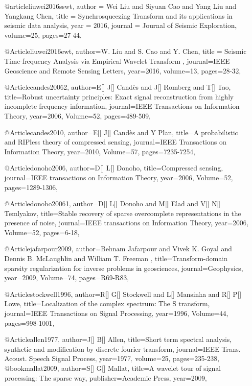 {@article{liuwei2016sswt,
  author =	 {Wei Liu and Siyuan Cao and Yang Liu and Yangkang Chen},
  title =	 {Synchrosqueezing Transform and its applications in seismic data analysis},
  year =	 2016,
  journal =	 {Journal of Seismic Exploration},
  volume={25},
 pages={27-44},
}

@Article{liuwei2016ewt,
  author={W. Liu and S. Cao and Y. Chen},
  title = {Seismic Time-frequency Analysis via Empirical Wavelet Transform
},
  journal={IEEE Geoscience and Remote Sensing Letters},
  year=2016,
  volume=13,
  pages={28-32},
}

@Article{candes20062,
  author={E[] J[] Cand\`{e}s and J[] Romberg and T[] Tao},
  title={Robust uncertainty principles: Exact signal reconstruction from highly incomplete frequency information},
  journal={IEEE Transactions on Information Theory},
  year=2006,
  Volume=52,
  pages={489-509},
}

@Article{candes2010,
  author={E[] J[] Cand\`{e}s and Y Plan},
  title={A probabilistic and RIPless theory of compressed sensing},
  journal={IEEE Transactions on Information Theory},
  year=2010,
  Volume=57,
  pages={7235-7254},
}


@Article{donoho2006,
  author={D[] L[] Donoho},
  title={Compressed sensing},
  journal={IEEE transactions on Information Theory},
  year=2006,
  Volume=52,
  pages={1289-1306},
}

@Article{donoho20061,
  author={D[] L[] Donoho and M[] Elad and V[] N[] Temlyakov},
  title={Stable recovery of sparse overcomplete representations in the presence of noise},
  journal={IEEE transactions on Information Theory},
  year=2006,
  Volume=52,
  pages={6-18},
}

@Article{jafarpour2009,
  author={Behnam Jafarpour and Vivek K. Goyal and Dennis B. McLaughlin and William T. Freeman },
  title={Transform-domain sparsity regularization for inverse problems in
geosciences},
  journal={Geophysics},
  year=2009,
  Volume=74,
  pages={R69-R83},
}

@Article{stockwell1996,
  author={R[] G[] Stockwell and L[] Mansinha and R[] P[] Lowe},
  title={Localization of the complex spectrum: The S transform},
  journal={IEEE Transactions on Signal Processing},
  year=1996,
  Volume=44,
  pages={998-1001},
}

@Article{allen1977,
  author={J[] B[] Allen},
  title={Short term spectral analysis, synthetic and modification by discrete fourier transform},
  journal={IEEE Trans. Acoust. Speech Signal Process},
  year=1977,
  volume=25,
  pages={235-238},
}
@book{mallat2009,
  author={S[] G[] Mallat},
  title={A wavelet tour of signal processing: The sparse way},
  publisher={Academic Press},
  year=2009,
}

}

